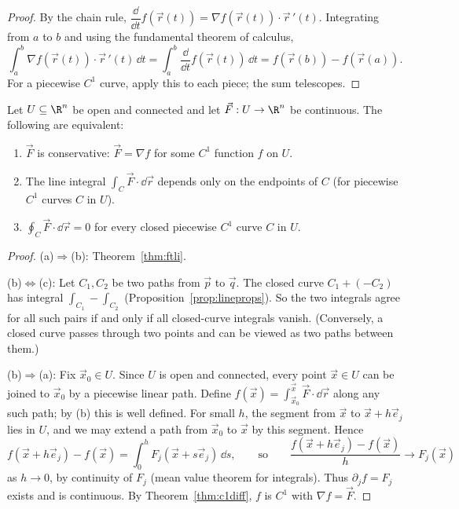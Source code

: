 \begin{proof}
By the chain rule, $\dfrac{\dd}{\dd t}f(\vec r(t))=\nabla f(\vec r(t))\cdot\vec r\,'(t)$. Integrating from $a$ to $b$ and using the fundamental theorem of calculus,
\[
\int_a^b\nabla f(\vec r(t))\cdot\vec r\,'(t)\,\dd t=\int_a^b\frac{\dd}{\dd t}f(\vec r(t))\,\dd t=f(\vec r(b))-f(\vec r(a)).
\]
For a piecewise $C^1$ curve, apply this to each piece; the sum telescopes.
\end{proof}

\begin{theorem}\label{thm:pathind}
Let $U\subseteq\R^n$ be open and connected and let $\vec F:U\to\R^n$ be continuous. The following are equivalent:
\begin{enumerate}[label=(\alph*)]
  \item $\vec F$ is conservative: $\vec F=\nabla f$ for some $C^1$ function $f$ on $U$.
  \item The line integral $\int_C\vec F\cdot\dd\vec r$ depends only on the endpoints of $C$ (for piecewise $C^1$ curves $C$ in $U$).
  \item $\oint_C\vec F\cdot\dd\vec r=0$ for every closed piecewise $C^1$ curve $C$ in $U$.
\end{enumerate}
\end{theorem}

\begin{proof}
(a)$\Rightarrow$(b): Theorem~\ref{thm:ftli}.

(b)$\Leftrightarrow$(c): Let $C_1,C_2$ be two paths from $\vec p$ to $\vec q$. The closed curve $C_1+(-C_2)$ has integral $\int_{C_1}-\int_{C_2}$ (Proposition~\ref{prop:lineprops}). So the two integrals agree for all such pairs if and only if all closed-curve integrals vanish. (Conversely, a closed curve passes through two points and can be viewed as two paths between them.)

(b)$\Rightarrow$(a): Fix $\vec x_0\in U$. Since $U$ is open and connected, every point $\vec x\in U$ can be joined to $\vec x_0$ by a piecewise linear path. Define $f(\vec x)=\int_{\vec x_0}^{\vec x}\vec F\cdot\dd\vec r$ along any such path; by (b) this is well defined. For small $h$, the segment from $\vec x$ to $\vec x+h\vec e_j$ lies in $U$, and we may extend a path from $\vec x_0$ to $\vec x$ by this segment. Hence
\[
f(\vec x+h\vec e_j)-f(\vec x)=\int_0^hF_j(\vec x+s\vec e_j)\,\dd s,\qquad\text{so}\qquad\frac{f(\vec x+h\vec e_j)-f(\vec x)}h\to F_j(\vec x)
\]
as $h\to0$, by continuity of $F_j$ (mean value theorem for integrals). Thus $\partial_jf=F_j$ exists and is continuous. By Theorem~\ref{thm:c1diff}, $f$ is $C^1$ with $\nabla f=\vec F$.
\end{proof}

